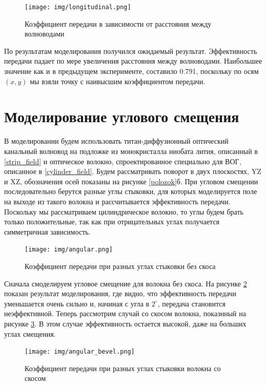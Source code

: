 \begin{figure}[h!]
	\texttt{[image: img/longitudinal.png]}
	\caption{Коэффициент передачи в зависимости от расстояния между волноводами}
	\label{longitudinal}
\end{figure}

По результатам моделирования получился ожидаемый результат. Эффективность передачи падает по мере увеличения расстояния между волноводами. Наибольшее значение как и в предыдущем эксперименте, составило 0.791, поскольку по осям $(x,y)$ мы взяли точку с наивысшим коэффициентом передачи.   

\section{Моделирование углового смещения}

В моделировании будем использовать титан-диффузионный оптический канальный волновод на подложке из монокристалла ниобата лития, описанный в \ref{strip_field} и оптическое волокно, спроектированное специально для ВОГ, описанное в \ref{cylinder_field}. Будем рассматривать поворот в двух плоскостях, YZ и XZ, обозначения осей показаны на рисунке \ref{polozok}б. При угловом смещении последовательно берутся разные углы стыковки, для которых моделируется поле на выходе из такого волокна и рассчитывается эффективность передачи. Поскольку мы рассматриваем цилиндрическое волокно, то углы будем брать только положительные, так как при отрицательных углах получается симметричная зависимость.

\begin{figure}[h!]
	\texttt{[image: img/angular.png]}
	\caption{Коэффициент передачи при разных углах стыковки без скоса}
	\label{angular}
\end{figure}

Сначала смоделируем угловое смещение для волокна без скоса. На рисунке \ref{angular} показан результат моделирования, где видно, что эффективность передачи уменьшается очень сильно и, начиная с угла в $2^\circ$, передача становится неэффективной. Теперь рассмотрим случай со скосом волокна, показнный на рисунке \ref{angular_bevel}. В этом случае эффективность остается высокой, даже на больших углах смещения.

\begin{figure}[h!]
	\texttt{[image: img/angular\_bevel.png]}
	\caption{Коэффициент передачи при разных углах стыковки волокна со скосом}
	\label{angular_bevel}
\end{figure}

